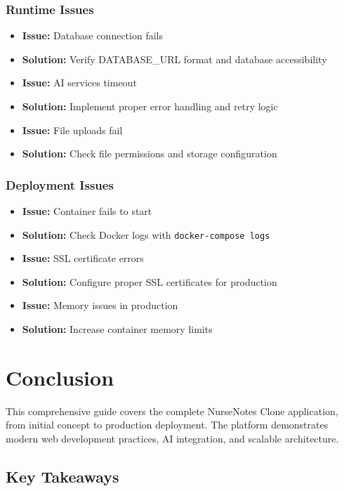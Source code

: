 \documentclass[12pt,a4paper]{article}
\newcommand{\code}[1]{\texttt{#1}}
\begin{document}
\subsubsection{Runtime Issues}
\begin{itemize}
    \item \textbf{Issue:} Database connection fails
    \item \textbf{Solution:} Verify DATABASE\_URL format and database accessibility

    \item \textbf{Issue:} AI services timeout
    \item \textbf{Solution:} Implement proper error handling and retry logic

    \item \textbf{Issue:} File uploads fail
    \item \textbf{Solution:} Check file permissions and storage configuration
\end{itemize}

\subsubsection{Deployment Issues}
\begin{itemize}
    \item \textbf{Issue:} Container fails to start
    \item \textbf{Solution:} Check Docker logs with \code{docker-compose logs}

    \item \textbf{Issue:} SSL certificate errors
    \item \textbf{Solution:} Configure proper SSL certificates for production

    \item \textbf{Issue:} Memory issues in production
    \item \textbf{Solution:} Increase container memory limits
\end{itemize}

\section{Conclusion}

This comprehensive guide covers the complete NurseNotes Clone application, from initial concept to production deployment. The platform demonstrates modern web development practices, AI integration, and scalable architecture.

\subsection{Key Takeaways}
\end{document}
